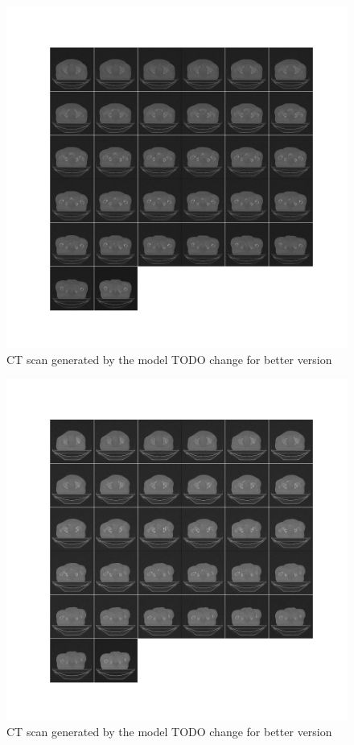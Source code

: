 \documentclass[11pt,a4paper]{report}
\begin{document}
\begin{figure}[H]
	\centering
	\includegraphics[scale=0.55]{images/generatedData1}
    \caption{CT scan generated by the model TODO change for better version}
\end{figure}
\begin{figure}[H]
	\centering
	\includegraphics[scale=0.55]{images/generatedData2}
    \caption{CT scan generated by the model TODO change for better version}
\end{figure}
\end{document}
